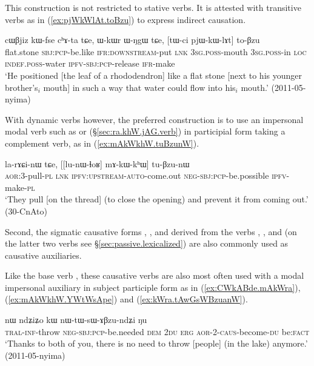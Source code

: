This construction is not restricted to stative verbs. It is attested with transitive verbs as in  (\ref{ex:pjWkWlAt.toBzu}) to express indirect causation.

\begin{exe}
\ex  \label{ex:pjWkWlAt.toBzu}
\gll  cɯβjiz kɯ-fse cʰɤ-ta tɕe, ɯ-kɯr ɯ-ŋgɯ tɕe, [tɯ-ci pjɯ-kɯ-lɤt] to-βzu \\
flat.stone \textsc{sbj}:\textsc{pcp}-be.like \textsc{ifr}:\textsc{downstream}-put \textsc{lnk} \textsc{3sg}.\textsc{poss}-mouth \textsc{3sg}.\textsc{poss}-in \textsc{loc} \textsc{indef}.\textsc{poss}-water \textsc{ipfv}-\textsc{sbj}:\textsc{pcp}-release \textsc{ifr}-make \\
\glt `He positioned [the leaf of a rhododendron] like a flat stone [next to his younger brother's$_i$ mouth] in such a way that water could flow into his$_i$ mouth.' (2011-05-nyima)
\end{exe}

With dynamic verbs however, the preferred construction is to use an impersonal modal verb such as  or   (§\ref{sec:ra.khW.jAG.verb}) in participial form taking a complement verb, as in (\ref{ex:mAkWkhW.tuBzunW}).


\begin{exe}
\ex  \label{ex:mAkWkhW.tuBzunW}
\gll la-rɤɕi-nɯ tɕe, [[lu-nɯ-ɬoʁ] mɤ-kɯ-kʰɯ] tu-βzu-nɯ  \\
\textsc{aor}:3\flobv{}-pull-\textsc{pl} \textsc{lnk} \textsc{ipfv}:\textsc{upstream}-\textsc{auto}-come.out \textsc{neg}-\textsc{sbj}:\textsc{pcp}-be.possible \textsc{ipfv}-make-\textsc{pl} \\
\glt `They pull [on the thread] (to close the opening) and prevent it from coming out.' (30-CnAto)
\end{exe}

Second, the sigmatic causative forms , ,  and  derived from the verbs , ,  and  (on the latter two verbs see §\ref{sec:passive.lexicalized}) are also commonly used as causative auxiliaries.

Like the base verb , these causative verbs are also most often used with a modal impersonal auxiliary in subject participle form as in (\ref{ex:CWkABde.mAkWra}), (\ref{ex:mAkWkhW.YWtWsApe}) and (\ref{ex:kWra.tAwGsWBzuanW}).

\begin{exe}
\ex  \label{ex:CWkABde.mAkWra}
\gll [ɕɯ-kɤ-βde mɤ-kɯ-ra] nɯ ndʑiʑo kɯ nɯ-tɯ-sɯ-ɤβzu-ndʑi ŋu  \\
\textsc{tral}-\textsc{inf}-throw  \textsc{neg}-\textsc{sbj}:\textsc{pcp}-be.needed \textsc{dem} \textsc{2du} \textsc{erg} \textsc{aor}-2-\textsc{caus}-become-\textsc{du} be:\textsc{fact} \\
\glt `Thanks to both of you, there is no need to throw [people] (in the lake) anymore.' (2011-05-nyima)
\end{exe}


